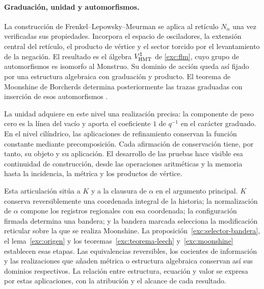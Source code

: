 \paragraph{Graduación, unidad y automorfismos.}
\label{inc-ampl-automorfismos}
La construcción de Frenkel--Lepowsky--Meurman se aplica al retículo
$N_\alpha$ una vez verificadas sus propiedades. Incorpora el espacio
de osciladores, la extensión central del retículo, el producto de vértice
y el sector torcido por el levantamiento de la negación. El resultado es
el álgebra $V^\natural_{\rm HMT}$ de \eqref{exc:flm}, cuyo grupo
de automorfismos es isomorfo al Monstruo. Su dominio de acción queda así
fijado por una estructura algebraica con graduación y producto. El teorema
de Moonshine de Borcherds determina posteriormente las trazas graduadas
con inserción de esos automorfismos \cite{flm,borcherds}.

La unidad adquiere en este nivel una realización precisa: la componente
de peso cero es la línea del vacío y aporta el coeficiente $1$ de
$q^{-1}$ en el carácter graduado. En el nivel cilíndrico, las
aplicaciones de refinamiento conservan la función constante mediante
precomposición. Cada afirmación de conservación tiene, por tanto, su
objeto y su aplicación. El desarrollo de las pruebas hace visible esa
continuidad de construcción, desde las operaciones aritméticas y la
memoria hasta la incidencia, la métrica y los productos de vértice.

Esta articulación sitúa a $K$ y a la clausura de $\alpha$ en el argumento
principal. $K$ conserva reversiblemente una coordenada integral de la
historia; la normalización de $\alpha$ compone los registros regionales
con esa coordenada; la configuración firmada determina una bandera; y
la bandera marcada selecciona la modificación reticular sobre la que se
realiza Moonshine. La proposición~\ref{exc:selector-bandera},
el lema~\ref{exc:origen} y los teoremas~\ref{exc:teorema-leech}
y~\ref{exc:moonshine} establecen esas etapas. Las equivalencias
reversibles, los cocientes de información y las realizaciones que añaden
métrica o estructura algebraica conservan así sus dominios respectivos.
La relación entre estructura, ecuación y valor se expresa por estas
aplicaciones, con la atribución y el alcance de cada resultado.
